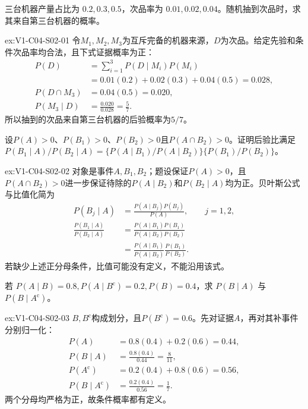 \begin{SLChapterExercisePairSection}
\begin{exercise}\label{ex:V1-C04-S02-01}
三台机器产量占比为 $0.2,0.3,0.5$，次品率为 $0.01,0.02,0.04$。随机抽到次品时，求其来自第三台机器的概率。
\end{exercise}
\label{sol:V1-C04-S02-01}
\begin{chapterexercisesolution}{ex:V1-C04-S02-01}
令$M_1,M_2,M_3$为互斥完备的机器来源，$D$为次品。给定先验和条件次品率均合法，且下式证据概率为正：
\[
\begin{aligned}
P(D)&=\sum_{i=1}^3P(D\mid M_i)P(M_i)\\
&=0.01(0.2)+0.02(0.3)+0.04(0.5)=0.028,\\
P(D\cap M_3)&=0.04(0.5)=0.020,\\
P(M_3\mid D)&=\frac{0.020}{0.028}=\frac57.
\end{aligned}
\]
所以抽到的次品来自第三台机器的后验概率为$5/7$。
\end{chapterexercisesolution}

\begin{exercise}\label{ex:V1-C04-S02-02}
设$P(A)>0$、$P(B_1)>0$、$P(B_2)>0$且$P(A\cap B_2)>0$。证明后验比满足 $P(B_1\mid A)/P(B_2\mid A)=\{P(A\mid B_1)/P(A\mid B_2)\}\{P(B_1)/P(B_2)\}$。
\end{exercise}
\label{sol:V1-C04-S02-02}
\begin{chapterexercisesolution}{ex:V1-C04-S02-02}
对象是事件$A,B_1,B_2$；题设保证$P(A)>0$，且$P(A\cap B_2)>0$进一步保证待除的$P(A\mid B_2)$和$P(B_2\mid A)$均为正。贝叶斯公式与比值化简为
\[
\begin{aligned}
P(B_j\mid A)&=\frac{P(A\mid B_j)P(B_j)}{P(A)},
\qquad j=1,2,\\
\frac{P(B_1\mid A)}{P(B_2\mid A)}
&=\frac{P(A\mid B_1)P(B_1)}{P(A\mid B_2)P(B_2)}\\
&=\frac{P(A\mid B_1)}{P(A\mid B_2)}\frac{P(B_1)}{P(B_2)}.
\end{aligned}
\]
若缺少上述正分母条件，比值可能没有定义，不能沿用该式。
\end{chapterexercisesolution}

\begin{exercise}\label{ex:V1-C04-S02-03}
若 $P(A\mid B)=0.8,P(A\mid B^{\mathrm c})=0.2,P(B)=0.4$，求 $P(B\mid A)$ 与 $P(B\mid A^{\mathrm c})$。
\end{exercise}
\label{sol:V1-C04-S02-03}
\begin{chapterexercisesolution}{ex:V1-C04-S02-03}
$B,B^{\mathrm c}$构成划分，且$P(B^{\mathrm c})=0.6$。先对证据$A$，再对其补事件分别归一化：
\[
\begin{aligned}
P(A)&=0.8(0.4)+0.2(0.6)=0.44,\\
P(B\mid A)&=\frac{0.8(0.4)}{0.44}=\frac8{11},\\
P(A^{\mathrm c})&=0.2(0.4)+0.8(0.6)=0.56,\\
P(B\mid A^{\mathrm c})&=\frac{0.2(0.4)}{0.56}=\frac17.
\end{aligned}
\]
两个分母均严格为正，故条件概率都有定义。
\end{chapterexercisesolution}


\end{SLChapterExercisePairSection}
